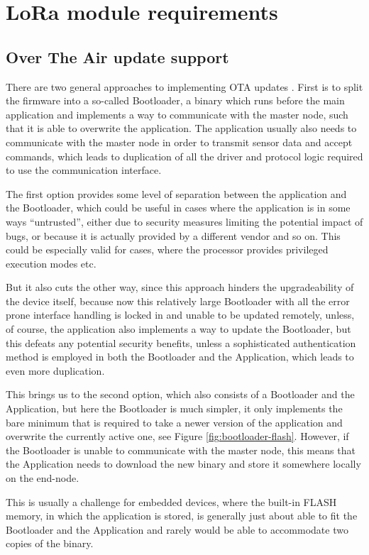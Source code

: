 \section{LoRa module requirements}
\subsection{\label{section:ota-update-support}Over The Air update support}
There are two general approaches to implementing OTA updates \cite{bucklin_brown_over--air_2024,noauthor_android_2024}. First is to split the firmware into a so-called Bootloader, a binary which runs before the main application and implements a way to communicate with the master node, such that it is able to overwrite the application. The application usually also needs to communicate with the master node in order to transmit sensor data and accept commands, which leads to duplication of all the driver and protocol logic required to use the communication interface.

The first option provides some level of separation between the application and the Bootloader, which could be useful in cases where the application is in some ways ``untrusted'', either due to security measures limiting the potential impact of bugs, or because it is actually provided by a different vendor and so on. This could be especially valid for cases, where the processor provides privileged execution modes etc.

But it also cuts the other way, since this approach hinders the upgradeability of the device itself, because now this relatively large Bootloader with all the error prone interface handling is locked in and unable to be updated remotely, unless, of course, the application also implements a way to update the Bootloader, but this defeats any potential security benefits, unless a sophisticated authentication method is employed in both the Bootloader and the Application, which leads to even more duplication.

This brings us to the second option, which also consists of a Bootloader and the Application, but here the Bootloader is much simpler, it only implements the bare minimum that is required to take a newer version of the application and overwrite the currently active one, see Figure \ref{fig:bootloader-flash}. However, if the Bootloader is unable to communicate with the master node, this means that the Application needs to download the new binary and store it somewhere locally on the end-node.

This is usually a challenge for embedded devices, where the built-in FLASH memory, in which the application is stored, is generally just about able to fit the Bootloader and the Application and rarely would be able to accommodate two copies of the binary.

